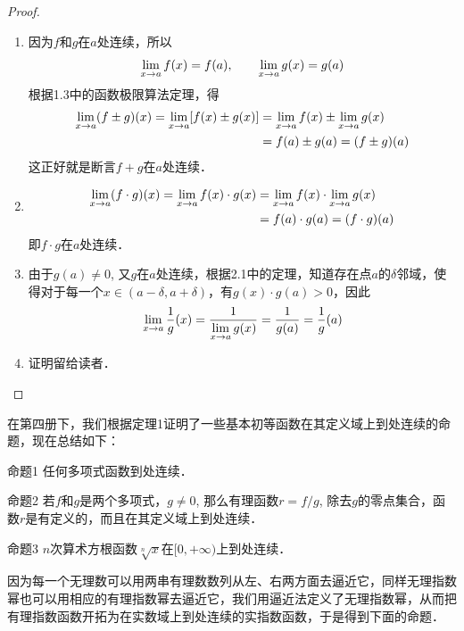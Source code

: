 \begin{proof}
\begin{enumerate}
    \item 因为$f$和$g$在$a$处连续，所以
    \[\displaystyle\lim_{x\to a} f (x) =f (a) ,\qquad  \lim_{x\to a} g (x) =g (a)\]
    根据1.3中的函数极限算法定理，得
   \[\begin{split}
    \displaystyle\lim_{x\to a} (f\pm g)(x)=\displaystyle\lim_{x\to a}[f(x)\pm g(x)]&=\displaystyle\lim_{x\to a} f(x)\pm \displaystyle\lim_{x\to a}g(x)\\
    &=f(a)\pm g(a)=(f\pm g)(a)
   \end{split} \]
    这正好就是断言$f+g$在$a$处连续．
    \item \[\begin{split}
        \displaystyle\lim_{x\to a} (f\cdot g) (x)=\displaystyle\lim_{x\to a}f(x)\cdot g(x)&=\displaystyle\lim_{x\to a} f(x)\cdot\displaystyle\lim_{x\to a}g (x)\\
        &=f (a) \cdot g (a) =(f\cdot g) (a) 
    \end{split}\]
    即$f\cdot g$在$a$处连续．
    \item 由于$g(a)\ne 0$, 又$g$在$a$处连续，根据2.1中的定理，知道存在点$a$的$\delta$邻域，使得对于每一个$x\in (a-\delta,a+\delta)$，有$g(x)\cdot g(a)>0$，因此
\[\displaystyle\lim_{x\to a} \dfrac{1}{g}(x)=\dfrac{1}{\displaystyle\lim_{x\to a} g(x)}=\dfrac{1}{g(a)}=\dfrac{1}{g}(a)\]

\item 证明留给读者．
\end{enumerate} 
\end{proof}

在第四册下，我们根据定理1证明了一些基本初等函数在其定义域上到处连续的命题，现在总结如下：

\begin{blk}
   {命题1} 任何多项式函数到处连续． 
\end{blk}

\begin{blk}{命题2}
    若$f$和$g$是两个多项式，$g\ne 0$, 那么有理函数$r=f/g$, 除去$g$的零点集合，函数$r$是有定义的，而且在其定义域上到处连续．
\end{blk}

\begin{blk}
   {命题3} $n$次算术方根函数$\sqrt[n]{x}$在$[0,+\infty)$上到处连续．
\end{blk}

因为每一个无理数可以用两串有理数数列从左、右两方面去逼近它，同样无理指数幂也可以用相应的有理指数幂去逼近它，我们用逼近法定义了无理指数幂，从而把有理指数函数开拓为在实数域上到处连续的实指数函数，于是得到下面的命题． 

